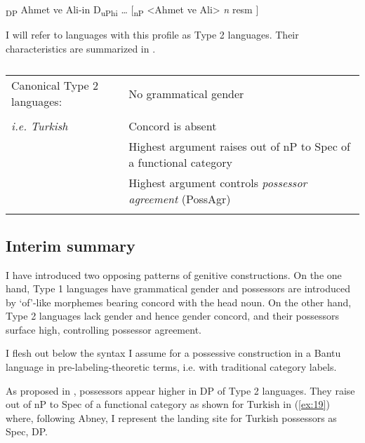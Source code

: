 \documentclass[output=paper
,modfonts
,nonflat]{langsci/langscibook}
\begin{document}
\begin{exe}
	{\lbrack}\textsubscript{DP} Ahmet ve Ali-in D\textsubscript{uPhi} … [\textsubscript{nP} <Ahmet ve Ali>  \textit{n} resm ]{\rbrack}
\end{exe}
I will refer to languages with this profile as Type 2 languages. Their characteristics are summarized in .
\begin{table}
	\caption{}
	\label{tab:2}
	\begin{tabularx}{\textwidth}{lX}
		\lsptoprule
		Canonical Type 2 languages: &  No grammatical gender\\ \\
		\textit{i.e. Turkish}  & Concord is absent\\
		& Highest argument raises out of nP to Spec of a functional category\\
		& Highest argument controls \textit{possessor agreement} (PossAgr)\\
		\lspbottomrule
	\end{tabularx}
\end{table} \newpage \noindent
\subsection{Interim summary} \label{sec:2.3}

I have introduced two opposing patterns of genitive constructions. On the one hand, Type 1 languages have grammatical gender and possessors are introduced by ‘of’-like morphemes bearing concord with the head noun. On the other hand, Type 2 languages lack gender and hence gender concord, and their possessors surface high, controlling possessor agreement. 

I flesh out below the syntax I assume for a possessive construction in a Bantu language in pre-labeling-theoretic terms, i.e. with traditional category labels.

\begin{figure}[!h]
	\begin{exe}
	\end{exe}
\end{figure}
\newpage \noindent As proposed in \citet{Abney1987}, possessors appear higher in DP of Type 2 languages. They raise out of nP to Spec of a functional category as shown for Turkish in (\ref{ex:19}) where, following Abney, I represent the landing site for Turkish possessors as Spec, DP.          
\end{document}
